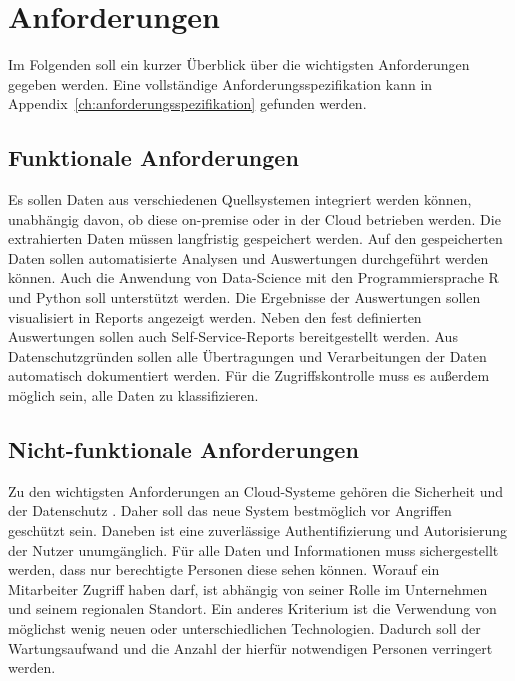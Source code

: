 \section{Anforderungen}
\label{sec:anforderungen}
Im Folgenden soll ein kurzer Überblick über die wichtigsten Anforderungen gegeben werden. Eine vollständige Anforderungsspezifikation kann in Appendix~\ref{ch:anforderungsspezifikation} gefunden werden. 

\subsection{Funktionale Anforderungen}
Es sollen Daten aus verschiedenen Quellsystemen integriert werden können, unabhängig davon, ob diese on-premise oder in der Cloud betrieben werden. Die extrahierten Daten müssen langfristig gespeichert werden. Auf den gespeicherten Daten sollen automatisierte Analysen und Auswertungen durchgeführt werden können. Auch die Anwendung von Data-Science mit den Programmiersprache R und Python soll unterstützt werden. Die Ergebnisse der Auswertungen sollen visualisiert in Reports angezeigt werden. Neben den fest definierten Auswertungen sollen auch Self-Service-Reports bereitgestellt werden. Aus Datenschutzgründen sollen alle Übertragungen und Verarbeitungen der Daten automatisch dokumentiert werden. Für die Zugriffskontrolle muss es außerdem möglich sein, alle Daten zu klassifizieren.

\subsection{Nicht-funktionale Anforderungen}
Zu den wichtigsten Anforderungen an Cloud-Systeme gehören die Sicherheit und der Datenschutz \cite{gurjar_cloud_2013}. Daher soll das neue System bestmöglich vor Angriffen geschützt sein. Daneben ist eine zuverlässige Authentifizierung und Autorisierung der Nutzer unumgänglich. Für alle Daten und Informationen muss sichergestellt werden, dass nur berechtigte Personen diese sehen können. Worauf ein Mitarbeiter Zugriff haben darf, ist abhängig von seiner Rolle im Unternehmen und seinem regionalen Standort. Ein anderes Kriterium ist die Verwendung von möglichst wenig neuen oder unterschiedlichen Technologien. Dadurch soll der Wartungsaufwand und die Anzahl der hierfür notwendigen Personen verringert werden.